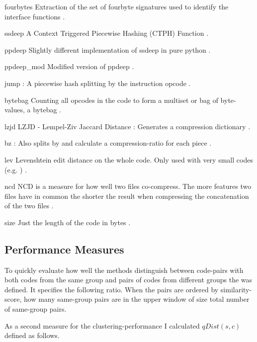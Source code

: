 \documentclass[../main.tex]{subfiles}
\begin{document}
\begin{desc}
  \item[fourbytes]
  Extraction of the set of fourbyte signatures used to identify the interface functions .
  \item[ssdeep]
  A Context Triggered Piecewise Hashing (CTPH) Function .
  \item[ppdeep]
  Slightly different implementation of ssdeep in pure python .
  \item[ppdeep\_mod]
  Modified version of ppdeep .
  \item[jump]
   : A piecewise hash splitting by the  instruction opcode  .
  \item[bytebag]
  Counting all opcodes in the code to form a multiset or bag of byte-values, a bytebag .
  \item[lzjd]
  LZJD - Lempel-Ziv Jaccard Distance : Generates a compression dictionary .
  \item[bz]
   : Also splits by  and calculate a compression-ratio for each piece .
  \item[lev]
  Levenshtein edit distance on the whole code. Only used with very small codes (e.g. ) .
  \item[ncd]
  NCD is a measure for how well two files co-compress. The more features two files have in common the shorter the result when compressing the concatenation of the two files .
  \item[size]
  Just the length of the code in bytes .
\end{desc}

\subsection{Performance Measures}

To quickly evaluate how well the methods distinguish between code-pairs with both codes from the same group and pairs of codes from different groups the  was defined.
It specifies the following ratio.
When the pairs are ordered by similarity-score, how many same-group pairs are in the upper window of size total number of same-group pairs.

As a second measure for the clustering-performance I calculated $qDist(s,c)$ defined as follows.
\end{document}
